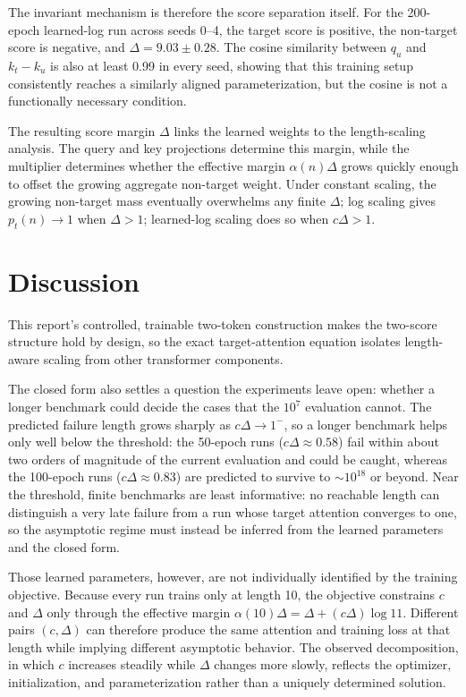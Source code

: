 \documentclass{article}
\begin{document}
The invariant mechanism is therefore the score separation itself. For the
200-epoch learned-log run across seeds 0--4, the target score is positive, the
non-target score is negative, and $\Delta=9.03\pm0.28$. The cosine similarity
between $q_u$ and $k_t-k_u$ is also at least 0.99 in every seed,
showing that this training setup consistently reaches a similarly aligned
parameterization, but the cosine is not a functionally necessary condition.

The resulting score margin $\Delta$ links the learned weights to the
length-scaling analysis. The query and key projections determine this margin,
while the multiplier determines whether the effective margin
$\alpha(n)\Delta$ grows quickly enough to offset the growing aggregate
non-target weight. Under constant scaling, the growing non-target mass
eventually overwhelms any finite $\Delta$; log scaling gives $p_t(n)\to1$ when
$\Delta>1$; learned-log scaling does so when $c\Delta>1$.

\section{Discussion}
\label{sec:discussion}

This report's controlled, trainable two-token construction makes the two-score
structure hold by design, so the exact target-attention equation isolates
length-aware scaling from other transformer components.

The closed form also settles a question the experiments leave open: whether a
longer benchmark could decide the cases that the $10^7$ evaluation cannot. The
predicted failure length grows sharply as $c\Delta\to1^{-}$, so a longer
benchmark helps only well below the threshold: the 50-epoch runs
($c\Delta\approx0.58$) fail within about two orders of magnitude of the current
evaluation and could be caught, whereas the 100-epoch runs
($c\Delta\approx0.83$) are predicted to survive to $\sim10^{18}$ or beyond.
Near the threshold, finite benchmarks are least informative: no reachable
length can distinguish a very late failure from a run whose target attention
converges to one, so the asymptotic regime must instead be inferred from the
learned parameters and the closed form.

Those learned parameters, however, are not individually identified by the
training objective. Because every run trains only at length 10, the objective
constrains $c$ and $\Delta$ only through the effective margin
$\alpha(10)\Delta=\Delta+(c\Delta)\log 11$. Different pairs $(c,\Delta)$ can
therefore produce the same attention and training loss at that length while
implying different asymptotic behavior. The observed decomposition, in which
$c$ increases steadily while $\Delta$ changes more slowly, reflects the
optimizer, initialization, and parameterization rather than a uniquely
determined solution.
\end{document}
